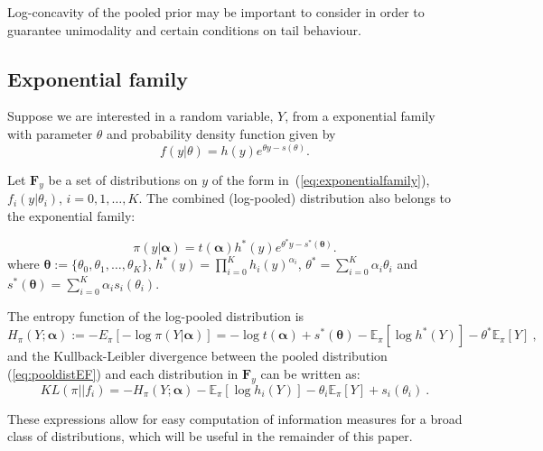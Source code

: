 \documentclass[a4paper, notitlepage, 10pt]{article}
\begin{document}
Log-concavity of the pooled prior may be important to consider in order to guarantee unimodality and certain conditions on tail behaviour.



\subsection*{Exponential family}

Suppose we are interested in a random variable, $Y$, from a exponential family with parameter $\theta$ and probability density function given by
\begin{equation}
\label{eq:exponentialfamily}
f(y|\theta) = h(y) e^{\theta y - s(\theta)}.
\end{equation}

Let $\mathbf{F}_{y}$ be a set of distributions on $y$ of the form in~(\ref{eq:exponentialfamily}), $f_i(y|\theta_i)$, $ i = 0, 1, \ldots, K$. 
The combined (log-pooled) distribution also belongs to the exponential family:

\begin{equation}
\label{eq:pooldistEF}
\pi(y| \boldsymbol\alpha ) = t(\boldsymbol\alpha) h^\ast (y) e^{\theta^\ast y - s^\ast (\boldsymbol\theta)}.
\end{equation}
where $\boldsymbol\theta :=\{\theta_0, \theta_1, \ldots, \theta_K \}$, $h^\ast (y) = \prod_{i = 0}^K h_i(y)^{\alpha_i}$,  $\theta^\ast = \sum_{i = 0}^K \alpha_i \theta_i$ and $s^\ast (\boldsymbol\theta) = \sum_{i = 0}^K \alpha_i s_i(\theta_i)$.

The entropy function of the log-pooled distribution is
\begin{equation}
\label{eq:entropydistEF}
H_\pi(Y; \boldsymbol\alpha) :=  - E_{\pi}\left[-\log \pi(Y | \boldsymbol\alpha) \right] = -\log t(\boldsymbol\alpha) + s^\ast (\boldsymbol\theta) - \mathbb{E}_\pi[\log h^\ast (Y)] - \theta^\ast \mathbb{E}_\pi[Y] \: ,
\end{equation}
and the Kullback-Leibler divergence between the pooled distribution (\ref{eq:pooldistEF}) and each distribution in $\mathbf{F}_{y}$ can be written as:
\begin{equation}
\label{eq:KLdistEF}
KL(\pi || f_i )  =  - H_\pi(Y; \boldsymbol\alpha) - \mathbb{E}_\pi[\log h_i(Y)] - \theta_i \mathbb{E}_\pi[Y] + s_i(\theta_i) \: .
\end{equation}

These expressions allow for easy computation of information measures for a broad class of distributions, which will be useful in the remainder of this paper.
\end{document}
